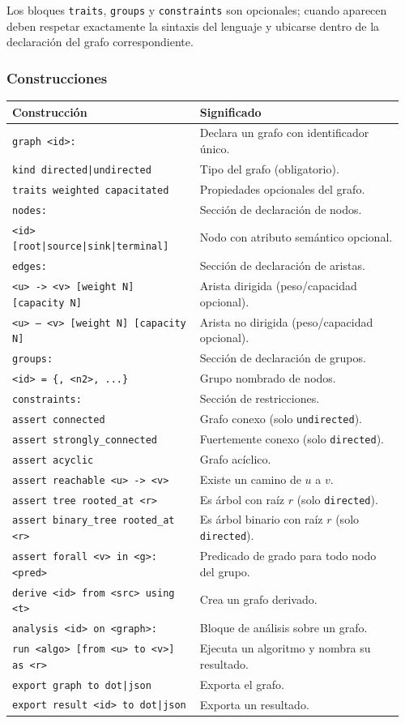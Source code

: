 \documentclass[11pt,a4paper]{article}
\newcommand{\code}[1]{\texttt{#1}}
\begin{document}
Los bloques \code{traits}, \code{groups} y \code{constraints} son opcionales;
cuando aparecen deben respetar exactamente la sintaxis del lenguaje y ubicarse
dentro de la declaración del grafo correspondiente.

\subsubsection{Construcciones}

\begin{longtable}{@{}p{0.46\linewidth}p{0.50\linewidth}@{}}
\toprule
\textbf{Construcción} & \textbf{Significado} \\
\midrule
\endhead
\code{graph <id>:} & Declara un grafo con identificador único. \\
\code{kind directed|undirected} & Tipo del grafo (obligatorio). \\
\code{traits weighted capacitated} & Propiedades opcionales del grafo. \\
\code{nodes:} & Sección de declaración de nodos. \\
\code{<id> [root|source|sink|terminal]} & Nodo con atributo semántico opcional. \\
\code{edges:} & Sección de declaración de aristas. \\
\code{<u> -> <v> [weight N] [capacity N]} & Arista dirigida (peso/capacidad opcional). \\
\code{<u> -- <v> [weight N] [capacity N]} & Arista no dirigida (peso/capacidad opcional). \\
\code{groups:} & Sección de declaración de grupos. \\
\code{<id> = \{<n1>, <n2>, ...\}} & Grupo nombrado de nodos. \\
\code{constraints:} & Sección de restricciones. \\
\code{assert connected} & Grafo conexo (solo \code{undirected}). \\
\code{assert strongly\_connected} & Fuertemente conexo (solo \code{directed}). \\
\code{assert acyclic} & Grafo acíclico. \\
\code{assert reachable <u> -> <v>} & Existe un camino de $u$ a $v$. \\
\code{assert tree rooted\_at <r>} & Es árbol con raíz $r$ (solo \code{directed}). \\
\code{assert binary\_tree rooted\_at <r>} & Es árbol binario con raíz $r$ (solo \code{directed}). \\
\code{assert forall <v> in <g>: <pred>} & Predicado de grado para todo nodo del grupo. \\
\code{derive <id> from <src> using <t>} & Crea un grafo derivado. \\
\code{analysis <id> on <graph>:} & Bloque de análisis sobre un grafo. \\
\code{run <algo> [from <u> to <v>] as <r>} & Ejecuta un algoritmo y nombra su resultado. \\
\code{export graph to dot|json} & Exporta el grafo. \\
\code{export result <id> to dot|json} & Exporta un resultado. \\
\bottomrule
\end{longtable}
\end{document}

